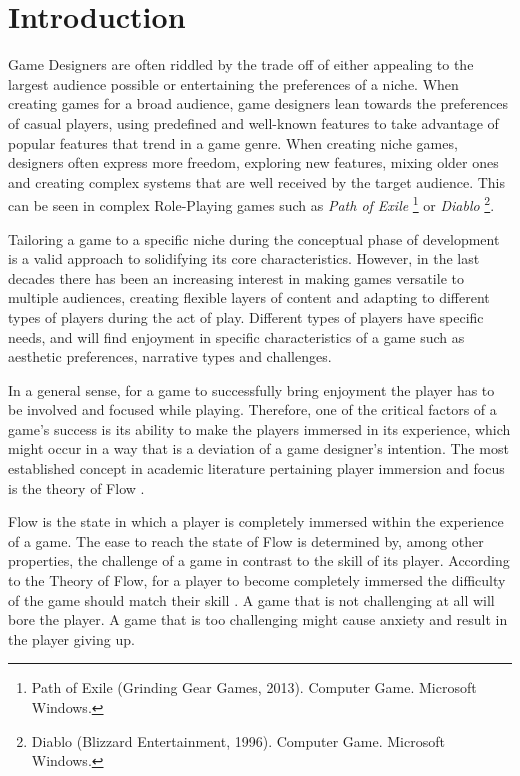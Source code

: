 \chapter{Introduction}

Game Designers are often riddled by the trade off of either appealing to the largest audience possible or entertaining the preferences of a niche. When creating games for a broad audience, game designers lean towards the preferences of casual players, using predefined and well-known features to take advantage of popular features that trend in a game genre. When creating niche games, designers often express more freedom, exploring new features, mixing older ones and creating complex systems that are well received by the target audience. This can be seen in complex Role-Playing games such as \emph{Path of Exile} \footnote{Path of Exile (Grinding Gear Games, 2013). Computer Game. Microsoft Windows.} or \emph{Diablo} \footnote{Diablo (Blizzard Entertainment, 1996). Computer Game. Microsoft Windows.}.

Tailoring a game to a specific niche during the conceptual phase of development is a valid approach to solidifying its core characteristics. However, in the last decades there has been an increasing interest in making games versatile to multiple audiences, creating flexible layers of content and adapting to different types of players during the act of play. Different types of players have specific needs, and will find enjoyment in specific characteristics of a game such as aesthetic preferences, narrative types and challenges.

In a general sense, for a game to successfully bring enjoyment the player has to be involved and focused while playing. Therefore, one of the critical factors of a game's success is its ability to make the players immersed in its experience, which might occur in a way that is a deviation of a game designer's intention. The most established concept in academic literature pertaining player immersion and focus is the theory of Flow \cite{BOOK_Flow}. 

Flow is the state in which a player is completely immersed within the experience of a game. The ease to reach the state of Flow is determined by, among other properties, the challenge of a game in contrast to the skill of its player. According to the Theory of Flow, for a player to become completely immersed the difficulty of the game should match their skill \cite{ARTICLE_FlowInGames}. A game that is not challenging at all will bore the player. A game that is too challenging might cause anxiety and result in the player giving up. 

